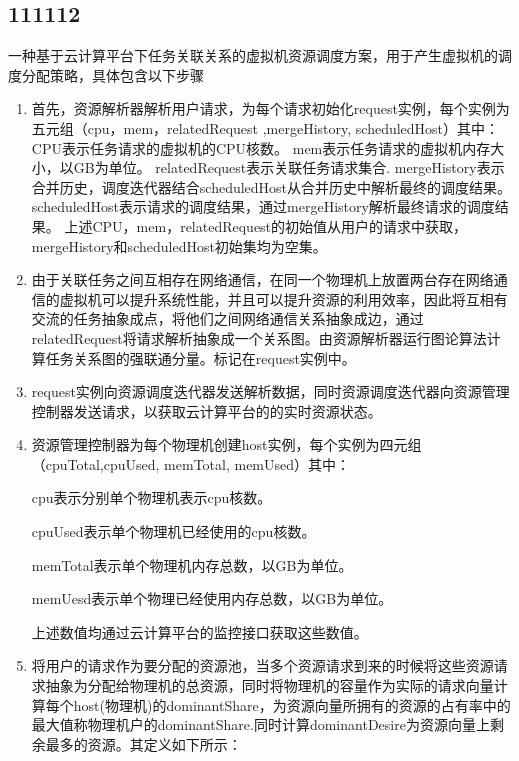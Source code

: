 \subsection{111112}
一种基于云计算平台下任务关联关系的虚拟机资源调度方案，用于产生虚拟机的调度分配策略，具体包含以下步骤
\begin{enumerate}
\item 首先，资源解析器解析用户请求，为每个请求初始化request实例，每个实例为五元组（cpu，mem，relatedRequest ,mergeHistory, scheduledHost）其中：
CPU表示任务请求的虚拟机的CPU核数。
mem表示任务请求的虚拟机内存大小，以GB为单位。
relatedRequest表示关联任务请求集合.
mergeHistory表示合并历史，调度迭代器结合scheduledHost从合并历史中解析最终的调度结果。
scheduledHost表示请求的调度结果，通过mergeHistory解析最终请求的调度结果。
上述CPU，mem，relatedRequest的初始值从用户的请求中获取，mergeHistory和scheduledHost初始集均为空集。

\item 由于关联任务之间互相存在网络通信，在同一个物理机上放置两台存在网络通信的虚拟机可以提升系统性能，并且可以提升资源的利用效率，因此将互相有交流的任务抽象成点，将他们之间网络通信关系抽象成边，通过relatedRequest将请求解析抽象成一个关系图。由资源解析器运行图论算法计算任务关系图的强联通分量。标记在request实例中。

\item request实例向资源调度迭代器发送解析数据，同时资源调度迭代器向资源管理控制器发送请求，以获取云计算平台的的实时资源状态。

\item 资源管理控制器为每个物理机创建host实例，每个实例为四元组（cpuTotal,cpuUsed, memTotal, memUsed）其中：

cpu表示分别单个物理机表示cpu核数。

cpuUsed表示单个物理机已经使用的cpu核数。

memTotal表示单个物理机内存总数，以GB为单位。

memUesd表示单个物理已经使用内存总数，以GB为单位。

上述数值均通过云计算平台的监控接口获取这些数值。

\item 将用户的请求作为要分配的资源池，当多个资源请求到来的时候将这些资源请求抽象为分配给物理机的总资源，同时将物理机的容量作为实际的请求向量计算每个host(物理机)的dominantShare，为资源向量所拥有的资源的占有率中的最大值称物理机户的dominantShare.同时计算dominantDesire为资源向量上剩余最多的资源。其定义如下所示：


\end{enumerate}

